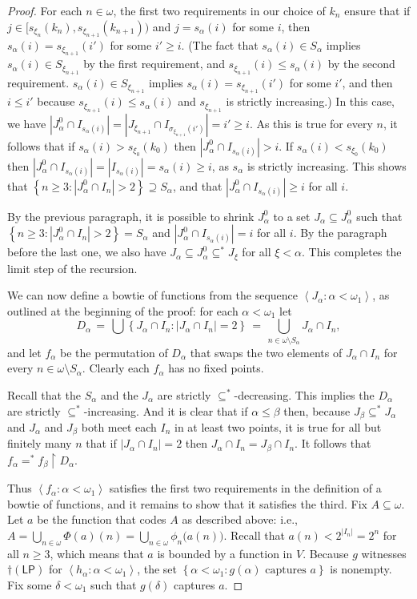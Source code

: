 \documentclass[10pt,a4paper]{amsart}
\renewcommand{\a}{\alpha}
\renewcommand{\b}{\beta}
\newcommand{\brackets}[1]{\left\langle #1 \right\rangle}
\newcommand{\cLP}{\dagger(\mathsf{LP})}
\newcommand{\card}[1]{\left\lvert #1 \right\rvert}
\newcommand{\dlt}{\delta}
\newcommand{\explicitSet}[1]{\left\lbrace #1 \right\rbrace}
\newcommand{\rest}{\!\restriction\!}
\newcommand{\s}{\sigma}
\newcommand{\seq}[2]{\brackets{#1 \colon #2}}
\newcommand{\set}[2]{\explicitSet{#1 \colon #2}}
\newcommand{\sub}{\subseteq}
\newcommand{\w}{\omega}
\begin{document}
\begin{proof}
For each $n \in \w$, the first two requirements in our choice of $k_n$ ensure that if $j \in \big[ s_{\xi_n}(k_n),s_{\xi_{n+1}}(k_{n+1}) \big)$ and $j = s_\a(i)$ for some $i$, then $s_\a(i) = s_{\xi_{n+1}}(i')$ for some $i' \geq i$. (The fact that $s_\a(i) \in S_\a$ implies $s_\a(i) \in S_{\xi_{n+1}}$ by the first requirement, and $s_{\xi_{n+1}}(i) \leq s_\a(i)$ by the second requirement. $s_\a(i) \in S_{\xi_{n+1}}$ implies $s_\a(i) = s_{\xi_{n+1}}(i')$ for some $i'$, and then $i \leq i'$ because $s_{\xi_{n+1}}(i) \leq s_\a(i)$ and $s_{\xi_{n+1}}$ is strictly increasing.) 
In this case, we have $|J^0_\a \cap I_{s_\a(i)}| = |J_{\xi_{n+1}} \cap I_{\s_{\xi_{n+1}}(i')}| = i' \geq i$. 
As this is true for every $n$, it follows that if $s_\a(i) > s_{\xi_0}(k_0)$ then $|J^0_\a \cap I_{s_\a(i)}| > i$. If $s_\a(i) < s_{\xi_0}(k_0)$ then $|J^0_\a \cap I_{s_\a(i)}| = |I_{s_\a(i)}| = s_\a(i) \geq i$, as $s_\a$ is strictly increasing. This shows that $\set{n \geq 3}{|J_\a^0 \cap I_n| > 2} \supseteq S_\a$, and that 
$|J_\a^0 \cap I_{s_\a(i)}| \geq i$ for all $i$. 

By the previous paragraph, it is possible to shrink $J_\a^0$ to a set $J_\a \sub J_\a^0$ such that 
$\set{n \geq 3}{|J_\a^0 \cap I_n| > 2} = S_\a$ and 
$|J_\a^0 \cap I_{s_\a(i)}| = i$ for all $i$. 
By the paragraph before the last one, we also have $J_\a \sub J^0_\a \sub^* J_\xi$ for all $\xi < \a$. 
This completes the limit step of the recursion. 

We can now define a bowtie of functions from the sequence $\seq{J_\a}{\a < \w_1}$, as outlined at the beginning of the proof: for each $\a < \w_1$ let 
$$D_\a \,=\, \textstyle \bigcup \set{J_\a \cap I_n}{\card{J_\a \cap I_n} = 2} \,=\, \bigcup_{n \in \w \setminus S_\a}J_\a \cap I_n,$$
and let $f_\a$ be the permutation of $D_\a$ that swaps the two elements of $J_\a \cap I_n$ for every $n \in \w \setminus S_\a$. Clearly each $f_\a$ has no fixed points. 

Recall that the $S_\a$ and the $J_\a$ are strictly $\sub^*$-decreasing. 
This implies the $D_\a$ are strictly $\sub^*$-increasing. 
And it is clear that if $\a \leq \b$ then, because $J_\b \sub^* J_\a$ and $J_\a$ and $J_\b$ both meet each $I_n$ in at least two points, it is true for all but finitely many $n$ that if $|J_\a \cap I_n| = 2$ then $J_\a \cap I_n = J_\b \cap I_n$. It follows that $f_\a =^* f_\b \rest D_\a$. 

Thus $\seq{f_\a}{\a < \w_1}$ satisfies the first two requirements in the definition of a bowtie of functions, and it remains to show that it satisfies the third. 
Fix $A \sub \w$. 
Let $a$ be the function that codes $A$ as described above: i.e., $A = \bigcup_{n \in \w}\Phi(a)(n) = \bigcup_{n \in \w}\phi_n\big(a(n)\big)$. 
Recall that $a(n) < 2^{|I_n|} = 2^n$ for all $n \geq 3$, which means that $a$ is bounded by a function in $V$. 
Because $g$ witnesses $\cLP$ for $\seq{h_\a}{\a < \w_1}$, the set 
$\set{\a < \w_1}{g(\a) \text{ captures } a}$ is nonempty. 
Fix some $\dlt < \w_1$ such that $g(\dlt)$ captures $a$. 


\end{proof}
\end{document}
